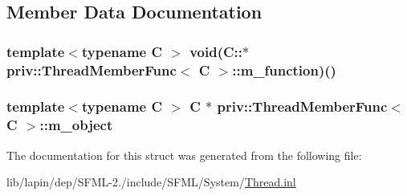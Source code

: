 \subsection{Member Data Documentation}
\hypertarget{structpriv_1_1_thread_member_func_a237f80d81258c6553fd18e86880ab6c4}{
\subsubsection[{m\-\_\-function}]{\setlength{\rightskip}{0pt plus 5cm}template$<$typename C $>$ void(C\-::$\ast$ {\bf priv\-::\-Thread\-Member\-Func}$<$ C $>$\-::m\-\_\-function)()}}\label{structpriv_1_1_thread_member_func_a237f80d81258c6553fd18e86880ab6c4}
\hypertarget{structpriv_1_1_thread_member_func_acd19c00f65795319eeb10830be7c4569}{
\subsubsection[{m\-\_\-object}]{\setlength{\rightskip}{0pt plus 5cm}template$<$typename C $>$ C $\ast$ {\bf priv\-::\-Thread\-Member\-Func}$<$ C $>$\-::m\-\_\-object}}\label{structpriv_1_1_thread_member_func_acd19c00f65795319eeb10830be7c4569}


The documentation for this struct was generated from the following file\-:\begin{DoxyCompactItemize}
\item 
lib/lapin/dep/\-S\-F\-M\-L-\/2./include/\-S\-F\-M\-L/\-System/\hyperlink{lapin_2dep_2_s_f_m_l-2_83_2include_2_s_f_m_l_2_system_2_thread_8inl}{Thread.\-inl}\end{DoxyCompactItemize}
